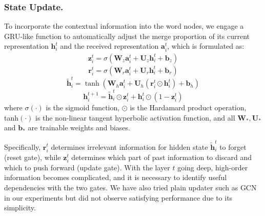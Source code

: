 \subsubsection{State Update.}
To incorporate the contextual information into the word nodes, we engage a GRU-like function \cite{li2016gated} to automatically adjust the merge proportion of its current representation $\mathbf{h}^{t}_i$ and the received representation $\mathbf{a}^{t}_i$, which is formulated as:
\begin{equation}\begin{array}{l}
\mathbf{z}_{i}^{t}=\sigma\left(\mathbf{W}_{z} \mathbf{a}_{i}^{t}+\mathbf{U}_{z} \mathbf{h}_{i}^{t}+\mathbf{b}_{z}\right)
\end{array}\end{equation}
\begin{equation}
\mathbf{r}_{i}^{t}=\sigma\left(\mathbf{W}_{r} \mathbf{a}_{i}^{t}+\mathbf{U}_{r} \mathbf{h}_{i}^{t}+\mathbf{b}_{r}\right)
\end{equation}
\begin{equation}\tilde{\mathbf{h}}_{i}^{t}=\tanh \left(\mathbf{W}_{h} \mathbf{a}_{i}^{t}+\mathbf{U}_{h}\left(\mathbf{r}_{i}^{t} \odot \mathbf{h}_{i}^{t}\right)+\mathbf{b}_{h}\right)\end{equation}
\begin{equation}\mathbf{h}_{i}^{t+1}=\tilde{\mathbf{h}}_{i}^{t} \odot \mathbf{z}_{i}^{t}+\mathbf{h}_{i}^{t} \odot\left(1-\mathbf{z}_{i}^{t}\right)\end{equation}
where $\sigma(\cdot)$ is the sigmoid function, $\odot$ is the Hardamard product operation, tanh$(\cdot)$ is the non-linear tangent hyperbolic activation function, and all $\mathbf{W_*, U_*}$ and $\mathbf{b_*}$ are trainable weights and biases. 

Specifically, $\mathbf{r}^{t}_i$ determines irrelevant information for hidden state $\tilde{\mathbf{h}}^{t}_i$ to forget (reset gate), while $\mathbf{z}^{t}_i$ determines which part of past information to discard and which to push forward (update gate). With the layer $t$ going deep, high-order information becomes complicated, and it is necessary to identify useful dependencies with the two gates. We have also tried plain updater such as GCN \cite{kipf2017semi} in our experiments but did not observe satisfying performance due to its simplicity.


